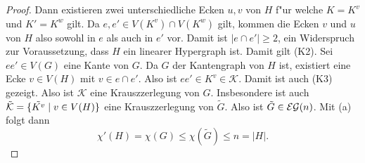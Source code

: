 \begin{proof}
  Dann existieren zwei unterschiedliche Ecken $u,v$ von $H$ f"ur welche $K= K^{v}$ und $K' = K^{w}$ gilt. 
  Da $e,e'\in V(K^{v}) \cap V(K^{w})$ gilt, kommen die Ecken $v$ und $u$ von $H$ also sowohl in $e$ als auch in $e'$ vor. Damit ist $|e\cap e'| \geq 2$, ein Widerspruch zur Voraussetzung, dass $H$ ein linearer Hypergraph ist. Damit gilt (K2).
  Sei $ee'\in V(G)$ eine Kante von $G$. Da $G$ der Kantengraph von $H$ ist, existiert eine Ecke $v\in V(H)$ mit $ v\in e\cap e'$. 
  Also ist $ee'\in K^{v}\in \mathcal{K}$. Damit ist auch (K3) gezeigt. Also ist $\mathcal{K}$ eine Krauszzerlegung von $G$. Insbesondere ist auch $\tilde{\mathcal{K}} = \{\tilde{K^{v}} \;|\; v\in V(H) \}$ eine Krauszzerlegung von $\tilde{G}$. Also ist $\tilde{G}\in {\cal EG}(n)$. Mit (a) folgt dann $$ \chi'(H) = \chi(G) \leq \chi(\tilde{G}) \leq n = |H|.$$
  

\end{proof}
